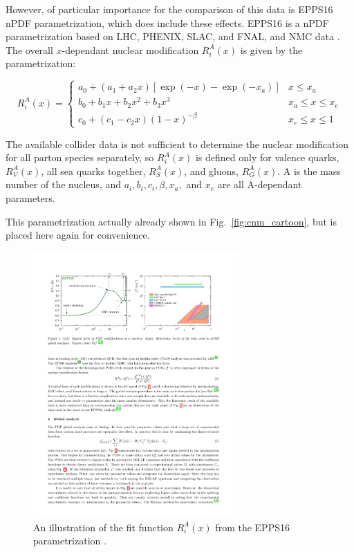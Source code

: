 However, of particular importance for the comparison of this data is EPPS16 nPDF parametrization, which does include these effects. EPPS16 is a nPDF parametrization based on LHC, PHENIX, SLAC, and FNAL, and NMC data \cite{epps16:2017}. The overall $x$-dependant nuclear modification $R_{i}^{A}(x)$ is given by the parametrization:

\begin{equation}
  R_{i}^{A}(x)=\left\{\begin{array}{ll}
      a_{0}+\left(a_{1}+a_{2} x\right)\left[\exp (-x)-\exp \left(-x_{a}\right)\right] & x \leq x_{a} \\
      b_{0}+b_{1} x+b_{2} x^{2}+b_{3} x^{3} & x_{a} \leq x \leq x_{e} \\
      c_{0}+\left(c_{1}-c_{2} x\right)(1-x)^{-\beta} & x_{e} \leq x \leq 1
  \end{array}\right.
\end{equation}

The available collider data is not sufficient to determine the nuclear modification for all parton species separately, so $R_{i}^{A}(x)$ is defined only for valence quarks,  $R_{V}^{A}(x)$, all sea quarks together,  $R_{S}^{A}(x)$, and gluons,  $R_{G}^{A}(x)$. A is the mass number of the nucleus, and  $a_i, b_i, c_i, \beta, x_a,$ and $x_e$ are all A-dependant parameters. 

This parametrization actually already shown in Fig.~\ref{fig:cnm_cartoon}, but is placed here again for convenience.

\begin{figure}[htpb]
  \centering
  \includegraphics[width=0.7\textwidth]{Introduction/cnm_cartoon}
  \caption{An illustration of the fit function $R_{i}^{A}(x)$ from the EPPS16 parametrization \cite{epps16:2017}.}
  \label{fig:cnm_cartoon_2}
\end{figure}


